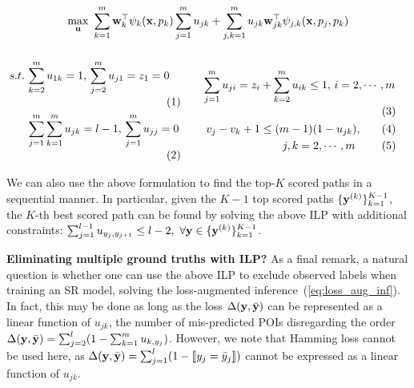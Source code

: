 \begin{equation}\eqmoveup\eqmoveup
\label{eq:obj}
\max_{\bu} ~\sum_{k=1}^m \w_k^\top \psi_k(\x, p_k) \sum_{j=1}^m u_{jk} +
            \sum_{j,k=1}^m u_{jk} \w_{jk}^\top \psi_{j, k}(\x, p_j, p_k)
\eqmoveup
\end{equation}
{$\displaystyle
\begin{minipage}{0.45\linewidth}
\begin{alignat}{2}
s.t. \, 
& \sum_{k=2}^m u_{1k} = 1, \, \sum_{j=2}^m u_{j1} = z_1=0                 \label{eq:cons1} \\
& \sum_{j=1}^m \sum_{k=1}^m u_{jk} = l-1, \, \sum_{j=1}^m u_{jj}=0        \label{eq:cons2}
\end{alignat}
\end{minipage}
\qquad
\begin{minipage}{0.5\linewidth}
\begin{alignat}{3}
\sum_{j=1}^m u_{ji} = z_i &+ \sum_{k=2}^m u_{ik} \le 1, \, i = 2,\cdots,m  \label{eq:cons3} \\
v_j - v_k + 1 &\le (m-1) (1-u_{jk}),                                       \nonumber \\
              & \qquad j,k = 2,\cdots,m                                    \label{eq:cons4}
\end{alignat}
\end{minipage}
$}

We can also use the above formulation to find the top-$K$ scored paths in a sequential manner. 
In particular, given the $K\!-\!1$ top scored paths $\{\mathbf{y}^{({k})}\}_{k=1}^{K-1}$, 
the $K\!$-th best scored path can be found by solving the above ILP with additional constraints:
$\sum_{j=1}^{l-1} u_{y_j, y_{j+1}} \le l-2, ~\forall \mathbf{y} \in \{\mathbf{y}^{(k)}\}_{k=1}^{K-1}$.

\textbf{Eliminating multiple ground truths with ILP?}
As a final remark, a natural question is whether one can use the above ILP 
to exclude observed labels when training an SR model,
\ie solving the loss-augmented inference~(\ref{eq:loss_aug_inf}).
In fact, this may be done
as long as the loss $\Delta(\mathbf{y},\bar{\mathbf{y}})$ can be represented as a linear function of $u_{jk}$,
\eg the number of mis-predicted POIs disregarding the order $\Delta(\mathbf{y}, \bar{\mathbf{y}}) = \sum_{j=2}^l (1 - \sum_{k=1}^m u_{k, y_j})$.
However, we note that Hamming loss %
cannot be used here, as $\Delta(\mathbf{y},\bar{\mathbf{y}}) = \sum_{j=1}^l (1 - \llbracket y_j = \bar y_j \rrbracket)$
cannot be expressed as a linear function of $u_{jk}$.

